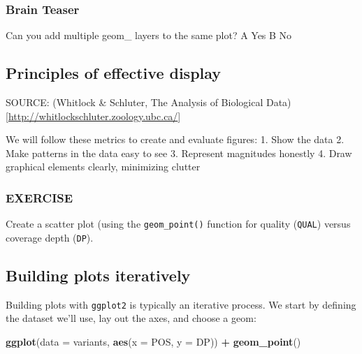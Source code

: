 \documentclass[
]{book}
\newenvironment{Shaded}{\begin{snugshade}}{\end{snugshade}}
\newcommand{\AttributeTok}[1]{\textcolor[rgb]{0.13,0.29,0.53}{#1}}
\newcommand{\FunctionTok}[1]{\textcolor[rgb]{0.13,0.29,0.53}{\textbf{#1}}}
\newcommand{\NormalTok}[1]{#1}
\newcommand{\SpecialCharTok}[1]{\textcolor[rgb]{0.81,0.36,0.00}{\textbf{#1}}}
\begin{document}
\subsubsection*{Brain Teaser}\label{brain-teaser-2}

Can you add multiple geom\_ layers to the same plot?
A Yes
B No

\subsection*{Principles of effective display}\label{principles-of-effective-display}

SOURCE: (Whitlock \& Schluter, The Analysis of Biological Data){[}\url{http://whitlockschluter.zoology.ubc.ca/}{]}

We will follow these metrics to create and evaluate figures:
1. Show the data
2. Make patterns in the data easy to see
3. Represent magnitudes honestly
4. Draw graphical elements clearly, minimizing clutter

\subsubsection*{EXERCISE}\label{exercise-2}

Create a scatter plot (using the \texttt{geom\_point()} function for quality (\texttt{QUAL}) versus coverage depth (\texttt{DP}).

\subsection*{Building plots iteratively}\label{building-plots-iteratively}

Building plots with \texttt{ggplot2} is typically an iterative process. We start by defining the dataset we'll use, lay out the axes, and choose a geom:

\begin{Shaded}
\begin{Highlighting}[]
\FunctionTok{ggplot}\NormalTok{(}\AttributeTok{data =}\NormalTok{ variants, }\FunctionTok{aes}\NormalTok{(}\AttributeTok{x =}\NormalTok{ POS, }\AttributeTok{y =}\NormalTok{ DP)) }\SpecialCharTok{+}
  \FunctionTok{geom\_point}\NormalTok{()}
\end{Highlighting}
\end{Shaded}
\end{document}
